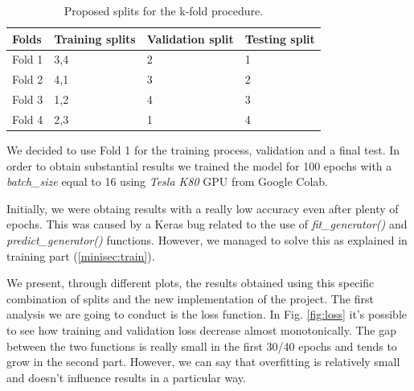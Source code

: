 \documentclass[11pt]{article}
\begin{document}
\begin{table}[h]
\caption{Proposed splits for the k-fold procedure.}
\begin{center}
\begin{tabular}{l|lll}

Folds  & \multicolumn{1}{l|}{Training splits} & \multicolumn{1}{l|}{Validation split} & Testing split \\ \hline

Fold 1 & 3,4                                  & 2                                     & 1             \\

Fold 2 & 4,1                                  & 3                                     & 2             \\

Fold 3 & 1,2                                  & 4                                     & 3             \\
 
Fold 4 & 2,3                                  & 1                                     & 4            
\end{tabular}
\end{center}
\label{table:folds}
\end{table}

\noindent
We decided to use Fold 1 for the training process, validation and a final test. In order to obtain substantial results we trained the model for 100 epochs with a \textit{batch\_size} equal to 16 using \textit{Tesla K80} GPU from Google Colab.

\noindent
Initially, we were obtaing results with a really low accuracy even after plenty of epochs. This was caused by a Keras bug related to the use of \textit{fit\_generator()} and \textit{predict\_generator()} functions. However, we managed to solve this as explained in training part (\ref{minisec:train}). 

\noindent
We present, through different plots, the results obtained using this specific combination of splits and the new implementation of the project. The first analysis we are going to conduct is the loss function. In Fig. \ref{fig:loss} it's possible to see how training and validation loss decrease almost monotonically. The gap between the two functions is really small in the first 30/40 epochs and tends to grow in the second part. However, we can say that overfitting is relatively small and doesn't influence results in a particular way.
\end{document}

